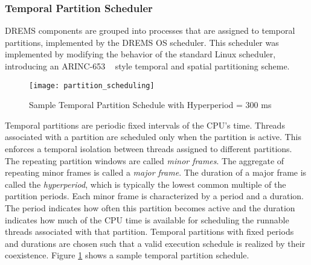 \subsubsection{Temporal Partition Scheduler}
\label{sec:Temporal_Partition_Scheduler}

DREMS components are grouped into processes that are assigned to temporal partitions, implemented by the DREMS OS scheduler. This scheduler was implemented by modifying the behavior of the standard Linux scheduler, introducing an ARINC-653 ~\cite{ARINC-653} style temporal and spatial partitioning scheme. 

\vspace{-0.12in}
\begin{figure}[ht]
\centering
\texttt{[image: partition\_scheduling]}
\caption{Sample Temporal Partition Schedule with Hyperperiod = 300 ms}
\label{fig:partition_scheduling}
\vspace{-0.1in}
\end{figure}


Temporal partitions are periodic fixed intervals of the CPU's time. Threads associated with a partition are scheduled only when the partition is active. This enforces a temporal isolation between threads assigned to different partitions. The repeating partition windows are called \emph{minor frames}. The aggregate of repeating minor frames is called a \emph{major frame}. The duration of a major frame is called the \emph{hyperperiod}, which is typically the lowest common multiple of the partition periods. Each minor frame is characterized by a period and a duration. The period indicates how often this partition becomes active and the duration indicates how much of the CPU time is available for scheduling the runnable threads associated with that partition. Temporal partitions with fixed periods and durations are chosen such that a valid execution schedule is realized by their coexistence. Figure \ref{fig:partition_scheduling} shows a sample temporal partition schedule. 

